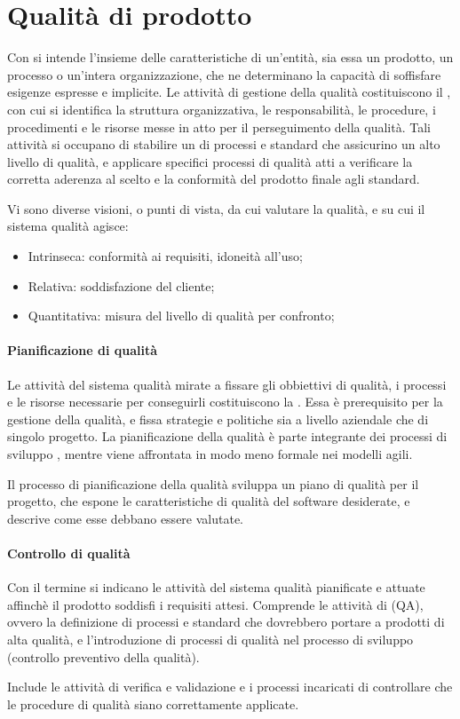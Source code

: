 \section{Qualità di prodotto}
Con  si intende l'insieme delle caratteristiche di un'entità, sia essa un prodotto, un processo o un'intera organizzazione, che ne determinano la capacità di soffisfare esigenze espresse e implicite. Le attività di gestione della qualità costituiscono il , con cui si identifica la struttura organizzativa, le responsabilità, le procedure, i procedimenti e le risorse messe in atto per il perseguimento della qualità. Tali attività  si occupano di stabilire un  di processi e standard che assicurino un alto livello di qualità, e applicare specifici processi di qualità atti a verificare la corretta aderenza al  scelto e la conformità del prodotto finale agli standard.

Vi sono diverse visioni, o punti di vista, da cui valutare la qualità, e su cui il sistema qualità agisce:
\begin{itemize}
	\item Intrinseca: conformità ai requisiti, idoneità all'uso;
	\item Relativa: soddisfazione del cliente;
	\item Quantitativa: misura del livello di qualità per confronto;
\end{itemize}

\paragraph{Pianificazione di qualità}
Le attività del sistema qualità mirate a fissare gli obbiettivi di qualità, i processi e le risorse necessarie per conseguirli costituiscono la . Essa è prerequisito per la gestione della qualità, e fissa strategie e politiche sia a livello aziendale che di singolo progetto. La pianificazione della qualità è parte integrante dei processi di sviluppo , mentre viene affrontata in modo meno formale nei modelli agili.

Il processo di pianificazione della qualità sviluppa un piano di qualità per il progetto, che espone le caratteristiche di qualità del software desiderate, e descrive come esse debbano essere valutate. 

\paragraph{Controllo di qualità}
Con il termine  si indicano le attività del sistema qualità pianificate e attuate affinchè il prodotto soddisfi i requisiti attesi. Comprende le attività di  (QA), ovvero la definizione di processi e standard che dovrebbero portare a prodotti di alta qualità, e l'introduzione di processi di qualità nel processo di sviluppo (controllo preventivo della qualità).

Include le attività di verifica e validazione e i processi incaricati di controllare che le procedure di qualità siano correttamente applicate.
